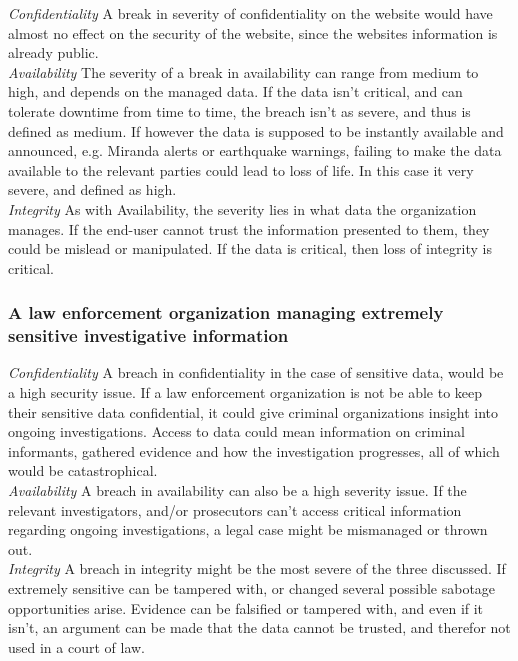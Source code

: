 \documentclass{article}
\begin{document}
\emph{Confidentiality}
A break in severity of confidentiality on the website would have almost no effect on the security of the website, since the websites information is already public. \\

\emph{Availability}
The severity of a break in availability can range from medium to high, and depends on the
managed data. If the data isn't critical, and can tolerate downtime from time to time, the
breach isn't as severe, and thus is defined as medium. If however the data is supposed to be
instantly available and announced, e.g. Miranda alerts or earthquake warnings, failing to make
the data available to the relevant parties could lead to loss of life. In this case it very
severe, and defined as high.\\

\emph{Integrity}
As with Availability, the severity lies in what data the organization manages. If the
end-user cannot trust the information presented to them, they could be mislead or
manipulated. If the data is critical, then loss of integrity is critical.\\

\subsubsection{A law enforcement organization managing extremely sensitive investigative information}
\emph{Confidentiality}
A breach in confidentiality in the case of sensitive data, would be a high security issue.
If a law enforcement organization is not be able to keep their sensitive data confidential,
it could give criminal organizations insight into ongoing investigations. Access to data 
could mean information on criminal informants, gathered evidence and how the investigation
progresses, all of which would be catastrophical.\\

\emph{Availability}
A breach in availability can also be a high severity issue. If the relevant investigators,
and/or prosecutors can't access critical information regarding ongoing investigations, a
legal case might be mismanaged or thrown out. \\

\emph{Integrity}
A breach in integrity might be the most severe of the three discussed. If extremely 
sensitive can be tampered with, or changed several possible sabotage opportunities arise.
Evidence can be falsified or tampered with, and even if it isn't, an argument can be
made that the data cannot be trusted, and therefor not used in a court of law.\\
\end{document}
